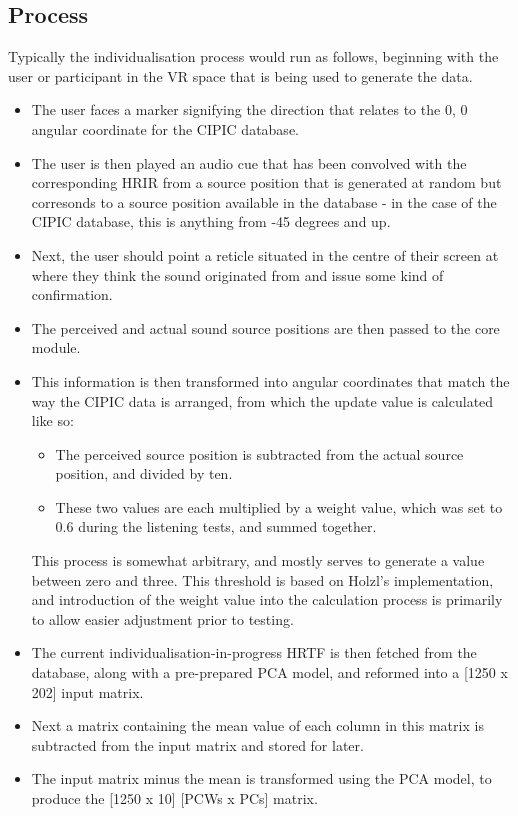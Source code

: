 \subsection{Process}
Typically the individualisation process would run as follows, beginning with the user or participant in the VR space that is being used to generate the data. 

\begin{itemize}
\item The user faces a marker signifying the direction that relates to the 0, 0 angular coordinate for the CIPIC database.
\item The user is then played an audio cue that has been convolved with the corresponding HRIR from a source position that is generated at random but corresonds to a source position available in the database - in the case of the CIPIC database, this is anything from -45 degrees and up.
\item  Next, the user should point a reticle situated in the centre of their screen at where they think the sound originated from and issue some kind of confirmation. 
\item The perceived and actual sound source positions are then passed to the core module.
\item This information is then transformed into angular coordinates that match the way the CIPIC data is arranged, from which the update value is calculated like so:
\begin{itemize}
\item The perceived source position is subtracted from the actual source position, and divided by ten. 
\item These two values are each multiplied by a weight value, which was set to 0.6 during the listening tests, and summed together. 
\end{itemize}
This process is somewhat arbitrary, and mostly serves to generate a value between zero and three. This threshold is based on Holzl's implementation, and introduction of the weight value into the calculation process is primarily to allow easier adjustment prior to testing. 
\item The current individualisation-in-progress HRTF is then fetched from the database, along with a pre-prepared PCA model, and reformed into a [1250 x 202] input matrix. 
\item Next a matrix containing the mean value of each column in this matrix is subtracted from the input matrix and stored for later. 
\item The input matrix minus the mean is transformed using the PCA model, to produce the [1250 x 10] [PCWs x PCs] matrix. 

\end{itemize}
